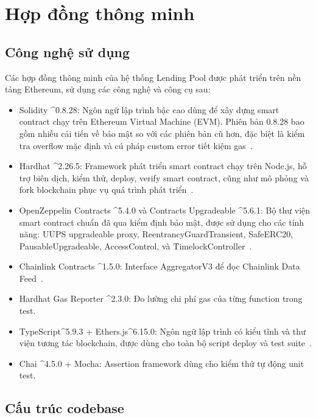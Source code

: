 \documentclass[../DoAn.tex]{subfiles}
\begin{document}
\section{Hợp đồng thông minh}


\subsection{Công nghệ sử dụng}


Các hợp đồng thông minh của hệ thống Lending Pool được phát triển trên nền tảng Ethereum, sử dụng các công nghệ và công cụ sau:

\begin{itemize}
  \item Solidity \textasciicircum{}0.8.28: Ngôn ngữ lập trình bậc cao dùng để xây dựng smart contract chạy trên Ethereum Virtual Machine (EVM). Phiên bản 0.8.28 bao gồm nhiều cải tiến về bảo mật so với các phiên bản cũ hơn, đặc biệt là kiểm tra overflow mặc định và cú pháp custom error tiết kiệm gas~\cite{EthereumDocs}.
  \item Hardhat \textasciicircum{}2.26.5: Framework phát triển smart contract chạy trên Node.js, hỗ trợ biên dịch, kiểm thử, deploy, verify smart contract, cũng như mô phỏng và fork blockchain phục vụ quá trình phát triển~\cite{HardhatDocs}.
  \item OpenZeppelin Contracts \textasciicircum{}5.4.0 và Contracts Upgradeable \textasciicircum{}5.6.1: Bộ thư viện smart contract chuẩn đã qua kiểm định bảo mật, được sử dụng cho các tính năng: UUPS upgradeable proxy, ReentrancyGuardTransient, SafeERC20, PausableUpgradeable, AccessControl, và TimelockController~\cite{OpenZeppelinDocs}.
  \item Chainlink Contracts \textasciicircum{}1.5.0: Interface AggregatorV3 để đọc Chainlink Data Feed~\cite{ChainlinkDocs}.
  \item Hardhat Gas Reporter \textasciicircum{}2.3.0: Đo lường chi phí gas của từng function trong test.
  \item TypeScript\textasciicircum{}5.9.3 + Ethers.js\textasciicircum{}6.15.0: Ngôn ngữ lập trình có kiểu tĩnh và thư viện tương tác blockchain, được dùng cho toàn bộ script deploy và test suite~\cite{EthersJsDocs}.
  \item Chai \textasciicircum{}4.5.0 + Mocha: Assertion framework dùng cho kiểm thử tự động unit test.
\end{itemize}


\subsection{Cấu trúc codebase}
\end{document}

